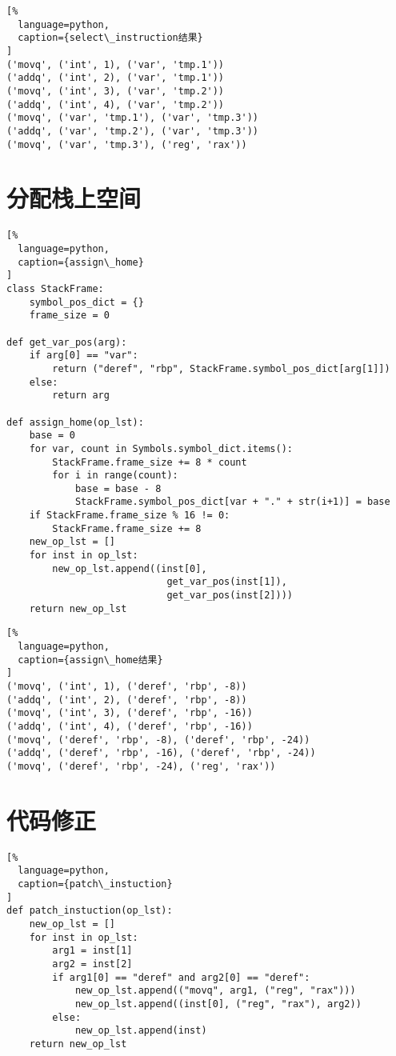 \begin{lstlisting}[%
  language=python,
  caption={select\_instruction结果}
]
('movq', ('int', 1), ('var', 'tmp.1'))
('addq', ('int', 2), ('var', 'tmp.1'))
('movq', ('int', 3), ('var', 'tmp.2'))
('addq', ('int', 4), ('var', 'tmp.2'))
('movq', ('var', 'tmp.1'), ('var', 'tmp.3'))
('addq', ('var', 'tmp.2'), ('var', 'tmp.3'))
('movq', ('var', 'tmp.3'), ('reg', 'rax'))
\end{lstlisting}

\section{分配栈上空间}

\begin{lstlisting}[%
  language=python,
  caption={assign\_home}
]
class StackFrame:
    symbol_pos_dict = {}
    frame_size = 0

def get_var_pos(arg):
    if arg[0] == "var":
        return ("deref", "rbp", StackFrame.symbol_pos_dict[arg[1]])
    else:
        return arg

def assign_home(op_lst):
    base = 0
    for var, count in Symbols.symbol_dict.items():
        StackFrame.frame_size += 8 * count
        for i in range(count):
            base = base - 8
            StackFrame.symbol_pos_dict[var + "." + str(i+1)] = base
    if StackFrame.frame_size % 16 != 0:
        StackFrame.frame_size += 8
    new_op_lst = []
    for inst in op_lst:
        new_op_lst.append((inst[0], 
                            get_var_pos(inst[1]), 
                            get_var_pos(inst[2])))
    return new_op_lst
\end{lstlisting}

\begin{lstlisting}[%
  language=python,
  caption={assign\_home结果}
]
('movq', ('int', 1), ('deref', 'rbp', -8))
('addq', ('int', 2), ('deref', 'rbp', -8))
('movq', ('int', 3), ('deref', 'rbp', -16))
('addq', ('int', 4), ('deref', 'rbp', -16))
('movq', ('deref', 'rbp', -8), ('deref', 'rbp', -24))
('addq', ('deref', 'rbp', -16), ('deref', 'rbp', -24))
('movq', ('deref', 'rbp', -24), ('reg', 'rax'))
\end{lstlisting}

\section{代码修正}

\begin{lstlisting}[%
  language=python,
  caption={patch\_instuction}
]
def patch_instuction(op_lst):
    new_op_lst = []
    for inst in op_lst:
        arg1 = inst[1]
        arg2 = inst[2]
        if arg1[0] == "deref" and arg2[0] == "deref":
            new_op_lst.append(("movq", arg1, ("reg", "rax")))
            new_op_lst.append((inst[0], ("reg", "rax"), arg2))
        else:
            new_op_lst.append(inst)
    return new_op_lst
\end{lstlisting}

